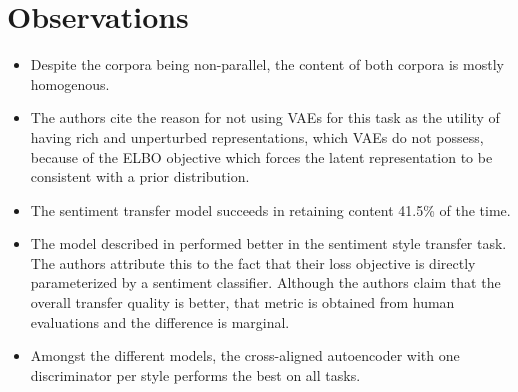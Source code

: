 \documentclass[12pt]{article}
\begin{document}
\section{Observations}
  \begin{itemize}
    \item Despite the corpora being non-parallel, the content of both corpora is mostly homogenous.
    \item The authors cite the reason for not using VAEs for this task as the utility of having rich and unperturbed representations, which VAEs do not possess, because of the ELBO objective which forces the latent representation to be consistent with a prior distribution.
    \item The sentiment transfer model succeeds in retaining content 41.5\% of the time.
    \item The model described in \cite{hu2017toward} performed better in the sentiment style transfer task. The authors attribute this to the fact that their loss objective is directly parameterized by a sentiment classifier. Although the authors claim that the overall transfer quality is better, that metric is obtained from human evaluations and the difference is marginal.
    \item Amongst the different models, the cross-aligned autoencoder with one discriminator per style performs the best on all tasks.
  \end{itemize}



\end{document}
